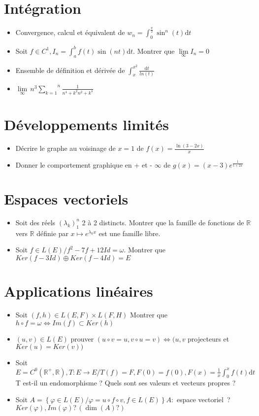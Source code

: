 \documentclass[a4paper, 11pt, french]{article}
\newcommand{\R}{\mathbb{R}}
\newcommand{\dt}{\mathrm{d}t}
\newcommand{\ev}{espace vectoriel}
\newcommand{\la}{\lambda}
\newcommand{\om}{\omega}
\newcommand{\ph}{\varphi}
\newcommand{\som}[2]{\overset{#2}{\underset{#1}{\sum}}}
\newcommand{\inv}[1]{\frac{1}{#1}}
\newcommand{\acc}[1]{\left\{ #1 \right\}}
\begin{document}
	\section*{Intégration}
	\begin{itemize}
 		\item Convergence, calcul et équivalent de $w_n= \int_0^{\frac{\pi}{2}}\sin^n(t)\dt$
 		\item Soit $f \in C^1, I_n=\int_a^b f(t)\sin(nt)\dt.$ Montrer que $\underset{\infty}\lim I_n=0$
 		\item Ensemble de définition et dérivée de $\int_x^{x^2}\frac{\dt}{ln(t)}$
 		\item $\underset{\infty}\lim \, n^3\som{k=1}{n}\inv{n^4+k^2n^2+k^4}$
	\end{itemize}

	\section*{Développements limités}
	\begin{itemize}
 		\item Décrire le graphe au voisinage de $x=1$ de $f(x)=\frac{\ln(3-2x)}{x}$
		\item Donner le comportement graphique en + et - $\infty$ de $g(x)=(x-3)e^{\inv{1+2x}}$
	\end{itemize}

	\section*{Espaces vectoriels}
	\begin{itemize}
 		\item Soit des réels $(\la_k)_1^n$ 2 à 2 distincts. Montrer que la famille de fonctions de $\R$ vers $\R$ définie par $x \mapsto e^{\la_kx}$ est une famille libre.
 		\item Soit $f \in L(E) / f^2-7f+12Id=\om.$ Montrer que $Ker(f-3Id) \oplus Ker(f-4Id)=E$
	\end{itemize}

	\section*{Applications linéaires}
	\begin{itemize}
 		\item Soit $(f,h) \in L(E,F)\times L(F,H)$ Montrer que $h\circ f=\om \iff Im(f) \subset Ker(h)$
 		\item $(u,v) \in L(E)$ prouver $(u\circ v=u, v\circ u=v) \iff (u,v$ projecteurs et ${Ker(u)=Ker(v))}$
 		\item Soit $E=C^0(\R^+,\R), T : E \rightarrow E / T(f)=F, F(0)=f(0), F(x)=\inv{x}\int_0^xf(t)\dt$ T est-il un endomorphisme ? Quels sont ses valeurs et vecteurs propres ?
		\item Soit $A=\acc{\ph \in L(E) / \ph=u\circ f\circ v, f\in L(E)} A :$ \ev \, ? $Ker(\ph), {Im(\ph) ?}\, (\dim(A) ?)$
	\end{itemize}
\end{document}
